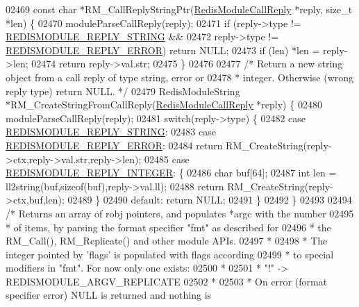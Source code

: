 \begin{DoxyCode}
{{{02469 \textcolor{keyword}{const} \textcolor{keywordtype}{char} *RM\_CallReplyStringPtr(\hyperlink{structRedisModuleCallReply}{RedisModuleCallReply} *reply, size\_t *len) \{
02470     moduleParseCallReply(reply);
02471     \textcolor{keywordflow}{if} (reply->type != \hyperlink{redismodule_8h_abc8a4584f9085b55692994244a26012b}{REDISMODULE\_REPLY\_STRING} &&
02472         reply->type != \hyperlink{redismodule_8h_ae70c78e91f22b2ff98795babccac44c9}{REDISMODULE\_REPLY\_ERROR}) \textcolor{keywordflow}{return} NULL;
02473     \textcolor{keywordflow}{if} (len) *len = reply->len;
02474     \textcolor{keywordflow}{return} reply->val.str;
02475 \}
02476 
02477 \textcolor{comment}{/* Return a new string object from a call reply of type string, error or}
02478 \textcolor{comment}{ * integer. Otherwise (wrong reply type) return NULL. */}
02479 RedisModuleString *RM\_CreateStringFromCallReply(\hyperlink{structRedisModuleCallReply}{RedisModuleCallReply} *reply) \{
02480     moduleParseCallReply(reply);
02481     \textcolor{keywordflow}{switch}(reply->type) \{
02482     \textcolor{keywordflow}{case} \hyperlink{redismodule_8h_abc8a4584f9085b55692994244a26012b}{REDISMODULE\_REPLY\_STRING}:
02483     \textcolor{keywordflow}{case} \hyperlink{redismodule_8h_ae70c78e91f22b2ff98795babccac44c9}{REDISMODULE\_REPLY\_ERROR}:
02484         \textcolor{keywordflow}{return} RM\_CreateString(reply->ctx,reply->val.str,reply->len);
02485     \textcolor{keywordflow}{case} \hyperlink{redismodule_8h_a9cff1d7e4fdc52b273949ed0d83e916b}{REDISMODULE\_REPLY\_INTEGER}: \{
02486         \textcolor{keywordtype}{char} buf[64];
02487         \textcolor{keywordtype}{int} len = ll2string(buf,\textcolor{keyword}{sizeof}(buf),reply->val.ll);
02488         \textcolor{keywordflow}{return} RM\_CreateString(reply->ctx,buf,len);
02489         \}
02490     \textcolor{keywordflow}{default}: \textcolor{keywordflow}{return} NULL;
02491     \}
02492 \}
02493 
02494 \textcolor{comment}{/* Returns an array of robj pointers, and populates *argc with the number}
02495 \textcolor{comment}{ * of items, by parsing the format specifier "fmt" as described for}
02496 \textcolor{comment}{ * the RM\_Call(), RM\_Replicate() and other module APIs.}
02497 \textcolor{comment}{ *}
02498 \textcolor{comment}{ * The integer pointed by 'flags' is populated with flags according}
02499 \textcolor{comment}{ * to special modifiers in "fmt". For now only one exists:}
02500 \textcolor{comment}{ *}
02501 \textcolor{comment}{ *     "!" -> REDISMODULE\_ARGV\_REPLICATE}
02502 \textcolor{comment}{ *}
02503 \textcolor{comment}{ * On error (format specifier error) NULL is returned and nothing is}
}}}
\end{DoxyCode}
